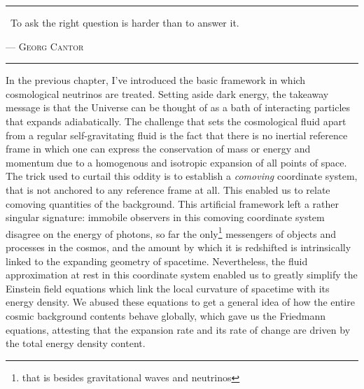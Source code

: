 \vspace*{3pc}
\begin{center}
\begin{minipage}{0.7\linewidth}
\hrule
\vspace{8pt}
{\huge\guillemotleft} ~To ask the right question is harder than to answer it. {\huge\guillemotright} \\
\vspace{2pt}
\begin{flushright}
--- \textsc{Georg Cantor}
\end{flushright}
\vspace{8pt}
\hrule
\end{minipage}
\end{center}
\vspace{3pc}


\begin{intro}
{\color{purple}I}n the previous chapter, I've introduced the basic framework in which cosmological neutrinos are treated. Setting aside dark energy, the takeaway message is that the Universe can be thought of as a bath of interacting particles that expands adiabatically. The challenge that sets the cosmological fluid apart from a regular self-gravitating fluid is the fact that there is no inertial reference frame in which one can express the conservation of mass or energy and momentum due to a homogenous and isotropic expansion of all points of space. The trick used to curtail this oddity is to establish a \emph{comoving} coordinate system, that is not anchored to any reference frame at all. This enabled us to relate comoving quantities of the background. This artificial framework left a rather singular signature: immobile observers in this comoving coordinate system disagree on the energy of photons, so far the only\footnote{that is besides gravitational waves and neutrinos} messengers of objects and processes in the cosmos, and the amount by which it is redshifted is intrinsically linked to the expanding geometry of spacetime. Nevertheless, the fluid approximation at rest in this coordinate system enabled us to greatly simplify the Einstein field equations which link the local curvature of spacetime with its energy density. We abused these equations to get a general idea of how the entire cosmic background contents behave globally, which gave us the Friedmann equations, attesting that the expansion rate and its rate of change are driven by the total energy density content. \\


\end{intro}
